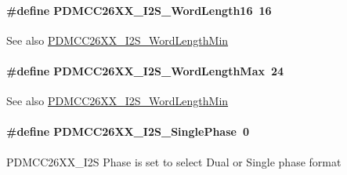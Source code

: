 \paragraph[{P\+D\+M\+C\+C26\+X\+X\+\_\+\+I2\+S\+\_\+\+Word\+Length16}]{\setlength{\rightskip}{0pt plus 5cm}\#define P\+D\+M\+C\+C26\+X\+X\+\_\+\+I2\+S\+\_\+\+Word\+Length16~16}\label{_p_d_m_c_c26_x_x__util_8h_ab4eded8479e91228d09d210a067c752f}
\begin{DoxySeeAlso}{See also}
\hyperlink{_p_d_m_c_c26_x_x__util_8h_af6b394e2eac2812d14d58c62b31467ad}{P\+D\+M\+C\+C26\+X\+X\+\_\+\+I2\+S\+\_\+\+Word\+Length\+Min} 
\end{DoxySeeAlso}
\paragraph[{P\+D\+M\+C\+C26\+X\+X\+\_\+\+I2\+S\+\_\+\+Word\+Length\+Max}]{\setlength{\rightskip}{0pt plus 5cm}\#define P\+D\+M\+C\+C26\+X\+X\+\_\+\+I2\+S\+\_\+\+Word\+Length\+Max~24}\label{_p_d_m_c_c26_x_x__util_8h_a516ce5fd2b154e2cc487ff73c03f5f07}
\begin{DoxySeeAlso}{See also}
\hyperlink{_p_d_m_c_c26_x_x__util_8h_af6b394e2eac2812d14d58c62b31467ad}{P\+D\+M\+C\+C26\+X\+X\+\_\+\+I2\+S\+\_\+\+Word\+Length\+Min} 
\end{DoxySeeAlso}
\paragraph[{P\+D\+M\+C\+C26\+X\+X\+\_\+\+I2\+S\+\_\+\+Single\+Phase}]{\setlength{\rightskip}{0pt plus 5cm}\#define P\+D\+M\+C\+C26\+X\+X\+\_\+\+I2\+S\+\_\+\+Single\+Phase~0}\label{_p_d_m_c_c26_x_x__util_8h_aa3869a39dc817d8297a1fffd77568d39}
P\+D\+M\+C\+C26\+X\+X\+\_\+\+I2\+S Phase is set to select Dual or Single phase format


